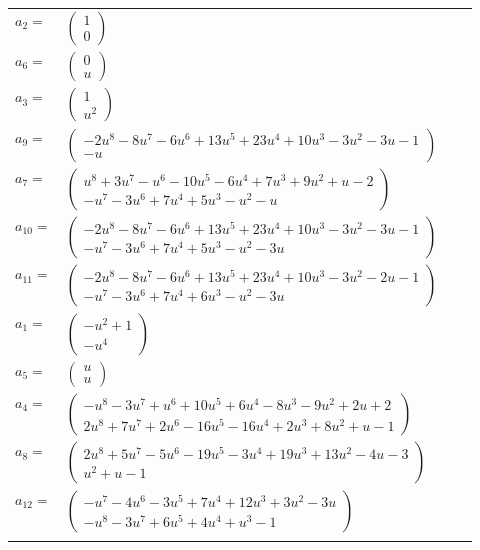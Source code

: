 \documentclass[1p]{elsarticle_modified}
\theoremstyle{definition}
\begin{document}
\begin{tabular}{m{7pt} m{180pt} m{7pt} m{180pt} }
\flushright $a_{2}=$&$\begin{pmatrix}1\\0\end{pmatrix}$ \\
\flushright $a_{6}=$&$\begin{pmatrix}0\\u\end{pmatrix}$ \\
\flushright $a_{3}=$&$\begin{pmatrix}1\\u^2\end{pmatrix}$ \\
\flushright $a_{9}=$&$\begin{pmatrix}-2 u^8-8 u^7-6 u^6+13 u^5+23 u^4+10 u^3-3 u^2-3 u-1\\- u\end{pmatrix}$ \\
\flushright $a_{7}=$&$\begin{pmatrix}u^8+3 u^7- u^6-10 u^5-6 u^4+7 u^3+9 u^2+u-2\\- u^7-3 u^6+7 u^4+5 u^3- u^2- u\end{pmatrix}$ \\
\flushright $a_{10}=$&$\begin{pmatrix}-2 u^8-8 u^7-6 u^6+13 u^5+23 u^4+10 u^3-3 u^2-3 u-1\\- u^7-3 u^6+7 u^4+5 u^3- u^2-3 u\end{pmatrix}$ \\
\flushright $a_{11}=$&$\begin{pmatrix}-2 u^8-8 u^7-6 u^6+13 u^5+23 u^4+10 u^3-3 u^2-2 u-1\\- u^7-3 u^6+7 u^4+6 u^3- u^2-3 u\end{pmatrix}$ \\
\flushright $a_{1}=$&$\begin{pmatrix}- u^2+1\\- u^4\end{pmatrix}$ \\
\flushright $a_{5}=$&$\begin{pmatrix}u\\u\end{pmatrix}$ \\
\flushright $a_{4}=$&$\begin{pmatrix}- u^8-3 u^7+u^6+10 u^5+6 u^4-8 u^3-9 u^2+2 u+2\\2 u^8+7 u^7+2 u^6-16 u^5-16 u^4+2 u^3+8 u^2+u-1\end{pmatrix}$ \\
\flushright $a_{8}=$&$\begin{pmatrix}2 u^8+5 u^7-5 u^6-19 u^5-3 u^4+19 u^3+13 u^2-4 u-3\\u^2+u-1\end{pmatrix}$ \\
\flushright $a_{12}=$&$\begin{pmatrix}- u^7-4 u^6-3 u^5+7 u^4+12 u^3+3 u^2-3 u\\- u^8-3 u^7+6 u^5+4 u^4+u^3-1\end{pmatrix}$\\&\end{tabular}
\end{document}
